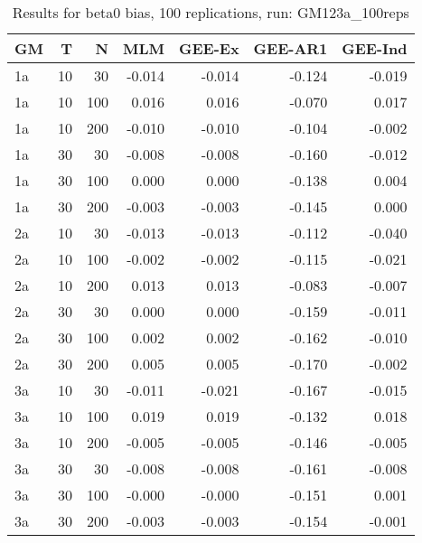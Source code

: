 \begin{table}[ht]
\centering
\begin{tabular}{lrrrrrr}
  \hline
GM & T & N & MLM & GEE-Ex & GEE-AR1 & GEE-Ind \\ 
  \hline
1a & 10 & 30 & -0.014 & -0.014 & -0.124 & -0.019 \\ 
  1a & 10 & 100 & 0.016 & 0.016 & -0.070 & 0.017 \\ 
  1a & 10 & 200 & -0.010 & -0.010 & -0.104 & -0.002 \\ 
  1a & 30 & 30 & -0.008 & -0.008 & -0.160 & -0.012 \\ 
  1a & 30 & 100 & 0.000 & 0.000 & -0.138 & 0.004 \\ 
  1a & 30 & 200 & -0.003 & -0.003 & -0.145 & 0.000 \\ 
   \hline
2a & 10 & 30 & -0.013 & -0.013 & -0.112 & -0.040 \\ 
  2a & 10 & 100 & -0.002 & -0.002 & -0.115 & -0.021 \\ 
  2a & 10 & 200 & 0.013 & 0.013 & -0.083 & -0.007 \\ 
  2a & 30 & 30 & 0.000 & 0.000 & -0.159 & -0.011 \\ 
  2a & 30 & 100 & 0.002 & 0.002 & -0.162 & -0.010 \\ 
  2a & 30 & 200 & 0.005 & 0.005 & -0.170 & -0.002 \\ 
   \hline
3a & 10 & 30 & -0.011 & -0.021 & -0.167 & -0.015 \\ 
  3a & 10 & 100 & 0.019 & 0.019 & -0.132 & 0.018 \\ 
  3a & 10 & 200 & -0.005 & -0.005 & -0.146 & -0.005 \\ 
  3a & 30 & 30 & -0.008 & -0.008 & -0.161 & -0.008 \\ 
  3a & 30 & 100 & -0.000 & -0.000 & -0.151 & 0.001 \\ 
  3a & 30 & 200 & -0.003 & -0.003 & -0.154 & -0.001 \\ 
   \hline
\end{tabular}
\caption{Results for beta0 bias, 100 replications, run: GM123a_100reps} 
\label{tab:beta0_bias}
\end{table}
